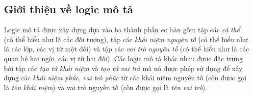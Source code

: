 \documentclass[12pt,a4paper,twoside]{report}
\theoremstyle{definition}
\begin{document}
\subsection{Giới thiệu về logic mô tả}

Logic mô tả được xây dựng dựa vào ba thành phần cơ bản gồm tập các {\em cá thể} (có thể hiểu như là các đối tượng), tập các {\em khái niệm nguyên tố} (có thể hiểu như là các lớp, các vị từ một đối) và tập các {\em vai trò nguyên tố} (có thể hiểu như là các quan hệ hai ngôi, các vị từ hai đối).
%
Các logic mô tả khác nhau được đặc trưng bởi tập các {\em tạo tử khái niệm} và {\em tạo tử vai trò} mà nó được phép sử dụng để xây dựng các {\em khái niệm phức}, {\em vai trò phức} từ các khái niệm nguyên tố (còn được gọi là {\em tên khái niệm}) và vai trò nguyên tố (còn được gọi là {\em tên vai trò}).
\end{document}
